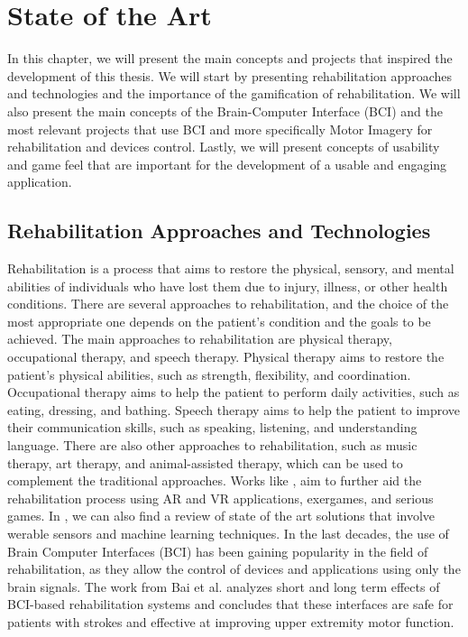 \chapter{State of the Art}\label{ch:state_of_the_art}
In this chapter, we will present the main concepts and projects that inspired the development of this thesis. 
We will start by presenting rehabilitation approaches and technologies and the importance of the gamification of rehabilitation. 
We will also present the main concepts of the Brain-Computer Interface (BCI) and the most relevant projects that use BCI and more specifically Motor Imagery for rehabilitation and devices control. 
Lastly, we will present concepts of usability and game feel that are important for the development of a usable and engaging application.

\section{Rehabilitation Approaches and Technologies}
Rehabilitation is a process that aims to restore the physical, sensory, and mental abilities of individuals who have lost them due to injury, illness, or other health conditions.
There are several approaches to rehabilitation, and the choice of the most appropriate one depends on the patient's condition and the goals to be achieved.
The main approaches to rehabilitation are physical therapy, occupational therapy, and speech therapy.
Physical therapy aims to restore the patient's physical abilities, such as strength, flexibility, and coordination.
Occupational therapy aims to help the patient to perform daily activities, such as eating, dressing, and bathing.
Speech therapy aims to help the patient to improve their communication skills, such as speaking, listening, and understanding language.
There are also other approaches to rehabilitation, such as music therapy, art therapy, and animal-assisted therapy, which can be used to complement the traditional approaches.
Works like \cite{202306.0333, 5567156, 10.4108/icst.pervasivehealth.2014.255277, trombetta}, aim to further aid the rehabilitation process using AR and VR applications, exergames, and serious games.
In \cite{BOUKHENNOUFA2022103197}, we can also find a review of state of the art solutions that involve werable sensors and machine learning techniques.
In the last decades, the use of Brain Computer Interfaces (BCI) has been gaining popularity in the field of rehabilitation, as they allow the control of devices and applications using only the brain signals.
The work from Bai et al. \cite{bai_immediate_2020} analyzes short and long term effects of BCI-based rehabilitation systems and concludes that these interfaces are safe for patients with strokes and effective at improving upper extremity motor function.

